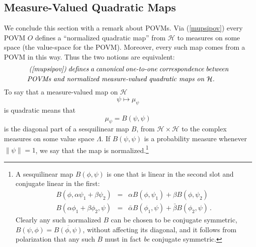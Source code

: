 \documentclass[12pt]{article}
\newcommand{\eq}[1]{(\ref{#1})}
\renewcommand{\a}{\alpha}
\renewcommand{\H}{\mbox{$\mathcal{H}$}}
\newcommand{\norm}{\|}
\begin{document}
\subsection{Measure-Valued Quadratic Maps}\label{sec:mvqf}
We conclude this section with a remark about POVMs. Via \eq{mupsipov}
every POVM $O$ defines a ``normalized quadratic map'' {}from \H{} to
measures on some space (the value-space for the POVM). Moreover, every
such map comes {}from a POVM in this way. Thus the two notions are
equivalent:
   \begin{equation}
\mbox{%
\begin{minipage}{0.85\textwidth}\openup 1.4\jot
   \setlength{\baselineskip}{12pt}\emph{ \eq{mupsipov} defines a
     canonical one-to-one correspondence between POVMs and normalized
     measure-valued quadratic maps on \H. }
   \end{minipage}}
\label{def:mvqm}
\end{equation}
To say that a measure-valued map on \H{}
\begin{equation}
\psi \mapsto \mu_{\psi}
\label{eq:qumap}
\end{equation}
is quadratic means that
\begin{equation}
\mu_{\psi}= B(\psi, \psi)
\label{eq:qumapb}
\end{equation}
is the diagonal part of a sesquilinear map $B$, {}from $\H\times\H$ to
the complex measures on some value space $\Lambda$. If $B(\psi, \psi)$
is a probability measure whenever $\norm\psi\norm =1$, we say that the
map is normalized.\footnote{A sesquilinear map $B(\phi,\psi)$ is one
   that is linear in the second slot and conjugate linear in the first:
\begin{eqnarray}
B(\phi, \a \psi_1 +\beta\psi_2) &=& \a B(\phi,\psi_1)+\beta
B(\phi,\psi_2)
\nonumber\\
B(\a\phi_1 +\beta\phi_2,\psi)&=&\bar {\a} B(\phi_1,\psi)+\bar
{\beta}B(\phi_2,\psi) \,. \nonumber \end{eqnarray}
Clearly any such normalized $B$ can be chosen to be conjugate
symmetric,
$  B(\psi, \phi)= \overline{B(\phi, \psi)}$,
without affecting its diagonal, and it follows
{}from  polarization that any such $B$ must in fact
   \emph{be} conjugate symmetric.}
\end{document}
